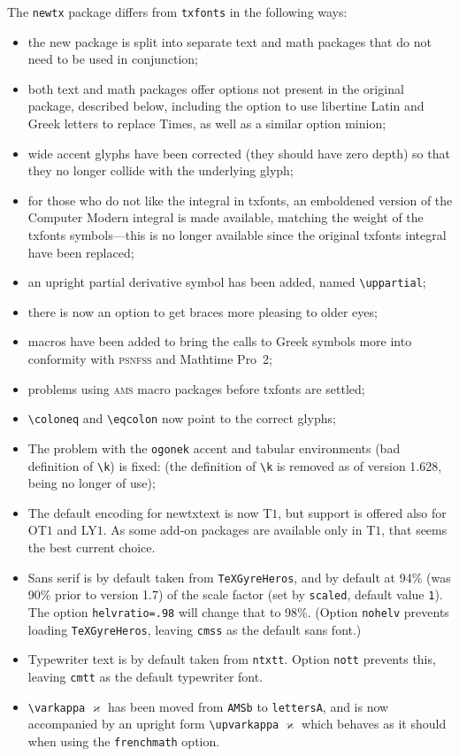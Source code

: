 \documentclass[\fsc]{article}
\theoremstyle{oldplain}
\theoremstyle{plain}
\begin{document}
The {\tt newtx} package differs from {\tt txfonts} in the following ways:
\begin{itemize}
\item
the new package is split into separate text and math packages that do not need to be used in conjunction;
\item both text and math packages offer options not present in the original package, described below, including the option to use \textsf{libertine} Latin and Greek letters to replace \textsf{Times}, as well as a similar option \textsf{minion};
\item wide accent glyphs have been corrected (they should have zero depth) so that they no longer collide with the underlying glyph;
\item for those who do not like the integral in \textsf{txfonts}, an emboldened version of the Computer Modern integral is made available, matching the weight of the \textsf{txfonts} symbols---this is no longer available since the original \textsf{txfonts} integral have been replaced;
\item an upright partial derivative symbol has been added, named \verb|\uppartial|;
\item there is now an option to get braces more pleasing to older eyes;
\item macros have been added to bring the calls to Greek symbols more into conformity with \textsc{psnfss} and Mathtime Pro~2;
\item problems using \textsc{ams} macro packages before \textsf{txfonts} are settled;
\item \verb|\coloneq| and \verb|\eqcolon| now point to the correct glyphs;
\item The problem with the {\tt ogonek} accent  and tabular environments (bad definition of \verb|\k|) is fixed: (the definition of \verb|\k| is removed as of version 1.628, being no longer of use);
\item The default encoding for \textsf{newtxtext} is now T$1$, but support is offered also for OT$1$ and LY$1$. As some add-on packages are available only in T$1$, that seems the best current choice.
\item Sans serif is by default taken from {\tt TeXGyreHeros}, and by default at 94\% (was 90\% prior to version 1.7) of the scale factor (set by {\tt scaled}, default value {\tt1}). The option {\tt helvratio=.98} will change that to 98\%. (Option {\tt nohelv} prevents loading {\tt TeXGyreHeros}, leaving {\tt cmss} as the default sans font.)
\item Typewriter text is by default taken from {\tt ntxtt}. Option {\tt nott} prevents this, leaving {\tt cmtt} as the default typewriter font.
\item \verb|\varkappa| $\varkappa$ has been moved from {\tt AMSb} to {\tt lettersA}, and is now accompanied by an upright form \verb|\upvarkappa| $\upvarkappa$ which behaves as it should when using the {\tt frenchmath} option.
\end{itemize}
\end{document}
